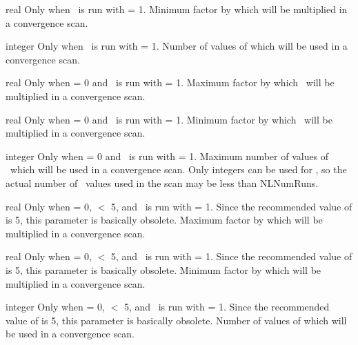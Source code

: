 \myhrule

{real}
{Only when \sfincsScan~is run with  = 1.}
{Minimum factor by which  will be multiplied in a convergence scan.}

\myhrule

{integer}
{Only when \sfincsScan~is run with  = 1.}
{Number of values of  which will be used in a convergence scan.}

\myhrule

{real}
{Only when  = 0 and \sfincsScan~is run with  = 1.}
{Maximum factor by which \NL~will be multiplied in a convergence scan.}

\myhrule

{real}
{Only when  = 0 and \sfincsScan~is run with  = 1.}
{Minimum factor by which \NL~will be multiplied in a convergence scan.}

\myhrule

{integer}
{Only when  = 0 and \sfincsScan~is run with  = 1.}
{Maximum number of values of \NL~which will be used in a convergence scan.  Only integers can be used
for \NL, so the actual number of \NL~values used in the scan may be less than {\ttfamily NLNumRuns}.}

\myhrule

{real}
{Only when  = 0,  $<$ 5, and \sfincsScan~is run with  = 1.
Since the recommended value of  is 5, this parameter is basically obsolete.}
{Maximum factor by which  will be multiplied in a convergence scan.}

\myhrule

{real}
{Only when  = 0,  $<$ 5, and \sfincsScan~is run with  = 1.
Since the recommended value of  is 5, this parameter is basically obsolete.}
{Minimum factor by which  will be multiplied in a convergence scan.}

\myhrule

{integer}
{Only when  = 0,  $<$ 5, and \sfincsScan~is run with  = 1.
Since the recommended value of  is 5, this parameter is basically obsolete.}
{Number of values of  which will be used in a convergence scan.}

